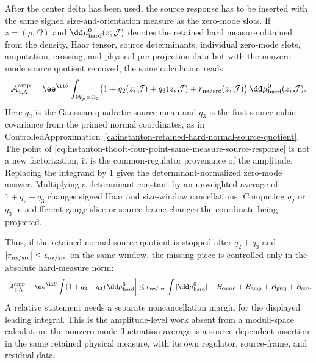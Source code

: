 \begin{controlledapproximation}
After the center delta has been used, the source response has to be inserted
with the same signed size-and-orientation measure as the zero-mode slots.  If
\(z=(\rho,\Omega)\) and
\(\dd\mu_{\rm hard}^{0}(z;\mathcal J)\) denotes the retained hard measure
obtained from the density, Haar tensor, source determinants, individual
zero-mode slots, amputation, crossing, and physical pre-projection data but
with the nonzero-mode source quotient removed, the same calculation reads
\begin{equation}
  \mathcal A_{4,\Lambda}^{\rm amp}
  =
  \ee^{\ii\theta}
  \int_{\mathcal W_\rho\times\Omega_3}
  \bigl(1+q_2(z;\mathcal J)+q_3(z;\mathcal J)
        +r_{\rm nz/src}(z;\mathcal J)\bigr)
  \,\dd\mu_{\rm hard}^{0}(z;\mathcal J).
  \label{eq:instanton-thooft-four-point-same-measure-source-response}
\end{equation}
Here \(q_2\) is the Gaussian quadratic-source mean and \(q_3\) is the first
source-cubic covariance from the primed normal coordinates, as in
ControlledApproximation~\ref{ca:instanton-retained-hard-normal-source-quotient}.
The point of
\eqref{eq:instanton-thooft-four-point-same-measure-source-response} is not a
new factorization; it is the common-regulator provenance of the amplitude.
Replacing the integrand by \(1\) gives the determinant-normalized zero-mode
answer.  Multiplying a determinant constant by an unweighted average of
\(1+q_2+q_3\) changes signed Haar and size-window cancellations.  Computing
\(q_2\) or \(q_3\) in a different gauge slice or source frame changes the
coordinate being projected.

Thus, if the retained normal-source quotient is stopped after \(q_2+q_3\) and
\(|r_{\rm nz/src}|\le\epsilon_{\rm nz/src}\) on the same window, the missing
piece is controlled only in the absolute hard-measure norm:
\begin{equation}
  \left|
    \mathcal A_{4,\Lambda}^{\rm amp}
    -
    \ee^{\ii\theta}
    \int
    (1+q_2+q_3)\,\dd\mu_{\rm hard}^{0}
  \right|
  \le
  \epsilon_{\rm nz/src}
  \int|\dd\mu_{\rm hard}^{0}|
  +B_{\rm coord}+B_{\rm amp}+B_{\rm proj}+B_{\rm sec}.
  \label{eq:instanton-thooft-four-point-source-response-bound}
\end{equation}
A relative statement needs a separate noncancellation margin for the displayed
leading integral.  This is the amplitude-level work absent from a
moduli-space calculation: the nonzero-mode fluctuation average is a
source-dependent insertion in the same retained physical measure, with its own
regulator, source-frame, and residual data.


\end{controlledapproximation}
